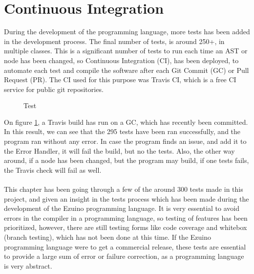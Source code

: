 \section{Continuous Integration}
During the development of the programming language, more tests has been added in the development process. The final number of tests, is around 250+, in multiple classes. This is a significant number of tests to run each time an AST or node has been changed, so Continuous Integration (CI), has been deployed, to automate each test and compile the software after each Git Commit (GC) or Pull Request (PR).  The CI used for this purpose was Travis CI, which is a free CI service for public git repositories. \\
\begin{figure}[H]
\centering
{}
\caption{Test}
\label{testa}
\end{figure}
On figure \ref{testa}, a Travis build has run on a GC, which has recently been committed. In this result, we can see that the 295 tests have been ran successfully, and the program ran without any error. In case the program finds an issue, and add it to the Error Handler, it will fail the build, but no the tests. Also, the other way around, if a node has been changed, but the program may build, if one tests fails, the Travis check will fail as well. \\
\\
This chapter has been going through a few of the around 300 tests made in this project, and given an insight in the tests process which has been made during the development of the Ezuino programming language. It is very essential to avoid errors in the compiler in a programming language, so testing of features has been prioritized, however, there are still testing forms like code coverage and whitebox (branch testing), which has not been done at this time. If the Ezuino programming language were to get a commercial release, these tests are essential to provide a large sum of error or failure correction, as a programming language is very abstract. 

